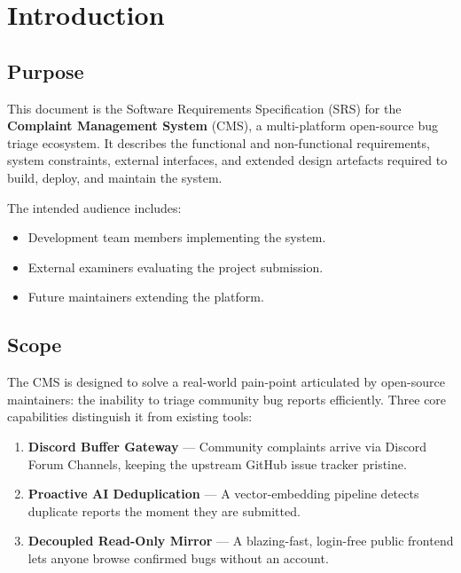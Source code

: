 \documentclass[12pt,a4paper]{report}
\begin{document}
\tableofcontents
\newpage

\chapter{Introduction}

\section{Purpose}
This document is the Software Requirements Specification (SRS) for the
\textbf{Complaint Management System} (CMS), a multi-platform open-source bug
triage ecosystem.  It describes the functional and non-functional requirements,
system constraints, external interfaces, and extended design artefacts required
to build, deploy, and maintain the system.

The intended audience includes:
\begin{itemize}
  \item Development team members implementing the system.
  \item External examiners evaluating the project submission.
  \item Future maintainers extending the platform.
\end{itemize}

\section{Scope}
The CMS is designed to solve a real-world pain-point articulated by open-source
maintainers: the inability to triage community bug reports efficiently.  Three
core capabilities distinguish it from existing tools:

\begin{enumerate}
  \item \textbf{Discord Buffer Gateway} --- Community complaints arrive via
    Discord Forum Channels, keeping the upstream GitHub issue tracker pristine.
  \item \textbf{Proactive AI Deduplication} --- A vector-embedding pipeline
    detects duplicate reports the moment they are submitted.
  \item \textbf{Decoupled Read-Only Mirror} --- A blazing-fast, login-free
    public frontend lets anyone browse confirmed bugs without an account.
\end{enumerate}
\end{document}
